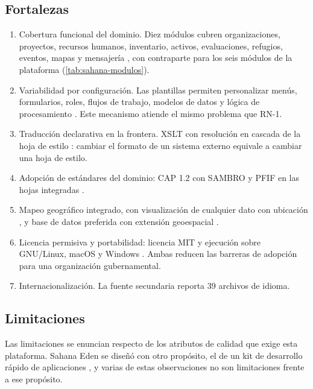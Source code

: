 \documentclass[11pt,letterpaper]{article}
\begin{document}
\subsection{Fortalezas}

\begin{enumerate}
  \item Cobertura funcional del dominio. Diez módulos cubren organizaciones, proyectos, recursos
        humanos, inventario, activos, evaluaciones, refugios, eventos, mapas y mensajería
        \cite{sahana-eden-legacy}, con contraparte para los seis módulos de la plataforma
        (\cref{tab:sahana-modulos}).
  \item Variabilidad por configuración. Las plantillas permiten personalizar menús, formularios,
        roles, flujos de trabajo, modelos de datos y lógica de procesamiento \cite{eden-wiki}. Este
        mecanismo atiende el mismo problema que RN-1.
  \item Traducción declarativa en la frontera. XSLT con resolución en cascada de la hoja de estilo
        \cite{eden-xslt}: cambiar el formato de un sistema externo equivale a cambiar una hoja de
        estilo.
  \item Adopción de estándares del dominio: CAP 1.2 con SAMBRO \cite{sambro} y PFIF en las hojas
        integradas \cite{eden-xslt}.
  \item Mapeo geográfico integrado, con visualización de cualquier dato con ubicación
        \cite{sahana-eden-legacy}, y base de datos preferida con extensión geoespacial
        \cite{eden-basics}.
  \item Licencia permisiva y portabilidad: licencia MIT \cite{eden-license} y ejecución sobre
        GNU/Linux, macOS y Windows \cite{osgeo}. Ambas reducen las barreras de adopción para una
        organización gubernamental.
  \item Internacionalización. La fuente secundaria \cite{desosa2018} reporta 39 archivos de idioma.
\end{enumerate}

\subsection{Limitaciones}

Las limitaciones se enuncian respecto de los atributos de calidad que exige esta plataforma. Sahana
Eden se diseñó con otro propósito, el de un kit de desarrollo rápido de aplicaciones
\cite{eden-repo}, y varias de estas observaciones no son limitaciones frente a ese propósito.
\end{document}
